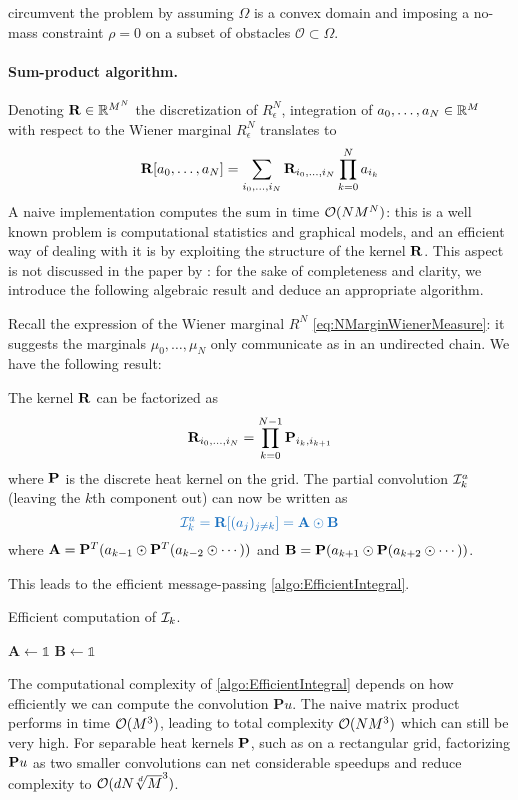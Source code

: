 \documentclass[../report.tex]{subfiles}
\begin{document}
\textcite{benamou:hal-01295299} circumvent the problem by assuming $\Omega$ is a convex domain and imposing a no-mass constraint $\rho = 0$ on a subset of obstacles $\mathscr{O} \subset \Omega$.

\paragraph{Sum-product algorithm.} Denoting $\mathbf{R} \in \mathbb{R}^{M^N}$ the discretization of $R^N_\epsilon$, integration of $a_0,\ldots,a_N\in\mathbb{R}^M$ with respect to the Wiener marginal $R^N_\epsilon$ translates to
\[
	\mathbf{R}[a_0, \ldots, a_N] =
	\sum_{i_0,\ldots,i_N} \mathbf{R}_{i_0,\ldots,i_N}\prod_{k=0}^N a_{i_k}
\]
A naive implementation computes the sum in time $\mathcal{O}(NM^N)$: this is a well known problem is computational statistics and graphical models, and an efficient way of dealing with it is by exploiting the structure of the kernel $\mathbf{R}$. This aspect is not discussed in the paper by \textcite{benamou:hal-01295299}: for the sake of completeness and clarity, we introduce the following algebraic result and deduce an appropriate algorithm.

Recall the expression of the Wiener marginal $R^N$ \cref{eq:NMarginWienerMeasure}: it suggests the marginals $\mu_0,\ldots,\mu_N$ only communicate as in an undirected chain. We have the following result:
\begin{prop}\label{prop:efficientConvol}
	The kernel $\mathbf{R}$ can be factorized as 
	\[
		\mathbf{R}_{i_0,\ldots,i_N} = \prod_{k=0}^{N-1} \mathbf{P}_{i_k,i_{k+1}}
	\]
	where $\mathbf{P}$ is the discrete heat kernel on the grid. The partial convolution $\mathcal{I}^a_k$ (leaving the $k$th component out) can now be written as
	\begin{equation}
	{\bluefont
		\calI_k^a = \bfR[(a_j)_{j\neq k}] =
		\mathbf{A} \odot \mathbf{B}
	}
	\end{equation}
	where $\mathbf{A} = \mathbf{P}^T (a_{k-1} \odot \mathbf{P}^T(a_{k-2} \odot \cdots))$ and $\mathbf{B} = \mathbf{P} (a_{k+1} \odot \mathbf{P} (a_{k+2}\odot \cdots))$.
\end{prop} This leads to the efficient message-passing \cref{algo:EfficientIntegral}.
\begin{algorithm}[h]
\caption{Efficient computation of $\mathcal{I}_k$.}\label{algo:EfficientIntegral}
$\mathbf{A} \leftarrow \mathds{1}$\;
$\mathbf{B} \leftarrow \mathds{1}$\;
\;
\end{algorithm}

The computational complexity of \cref{algo:EfficientIntegral} depends on how efficiently we can compute the convolution $\mathbf{P}u$. The naive matrix product performs in time $\mathcal{O}(M^3)$, leading to total complexity $\mathcal{O}(NM^3)$ which can still be very high. For separable heat kernels $\mathbf{P}$, such as on a rectangular grid, factorizing $\mathbf{P} u$ as two smaller convolutions can net considerable speedups \parencite[see][p.~74]{peyr2018computational} and reduce complexity to $\mathcal{O}(dN\sqrt[d]{M}^3)$.
\end{document}
